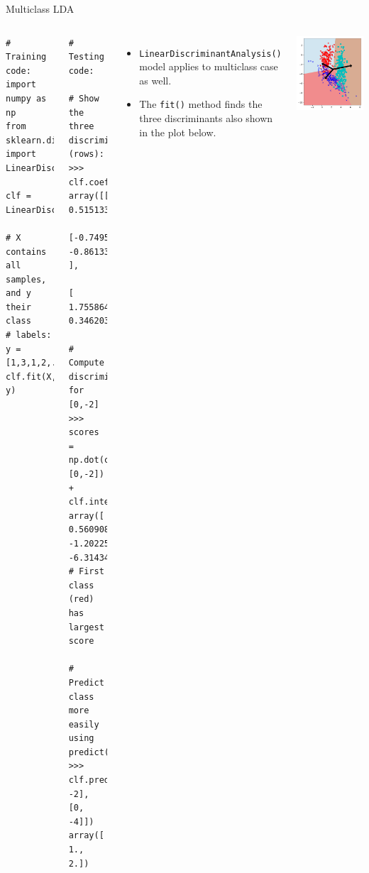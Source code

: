 \documentclass[10pt, aspectratio=169]{beamer} %
\begin{document}
\begin{frame}[fragile,allowframebreaks=0.8]
 {Multiclass LDA}
\begin{columns}[onlytextwidth]
\begin{lstlisting}
# Training code:
import numpy as np
from sklearn.discriminant_analysis import LinearDiscriminantAnalysis

clf = LinearDiscriminantAnalysis()

# X contains all samples, and y their class
# labels: y = [1,3,1,2,...]
clf.fit(X, y)
\end{lstlisting}
\begin{lstlisting}
# Testing code:

# Show the three discriminants (rows):
>>> clf.coef_
array([[-1.00629245,  0.51513354], 
       [-0.74957209, -0.8613368 ], 
       [ 1.75586454,  0.34620326]])

# Compute discriminants for [0,-2]
>>> scores = np.dot(clf.coef_, [0,-2]) + clf.intercept_
array([ 0.56090889, -1.20225066, -6.31434368])
# First class (red) has largest score

# Predict class more easily using predict()
>>> clf.predict([[0, -2], [0, -4]])
array([ 1.,  2.])
\end{lstlisting}
\begin{itemize}
\item \verb+LinearDiscriminantAnalysis()+ model applies to multiclass case as well.
\item The \verb+fit()+ method finds the three discriminants also shown in the plot below.
\end{itemize}
\centerline{\includegraphics[width=0.55\columnwidth]{3Class_LDA_classes.pdf}}
\end{columns}
\end{frame}
\end{document}
